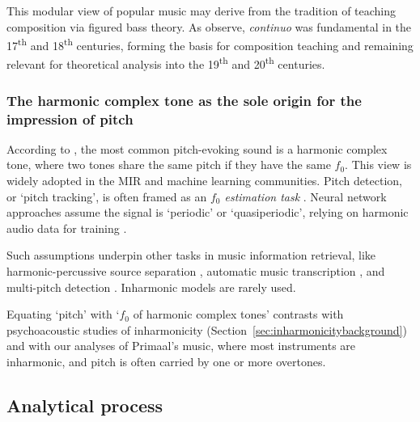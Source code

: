 \documentclass{article}
\begin{document}
This modular view of popular music may derive from the tradition of teaching composition via figured bass theory. As \citet{williams2001continuo} observe, \emph{continuo} was fundamental in the 17\textsuperscript{th} and 18\textsuperscript{th} centuries, forming the basis for composition teaching and remaining relevant for theoretical analysis into the 19\textsuperscript{th} and 20\textsuperscript{th} centuries.



\subsubsection{The harmonic complex tone as the sole origin for the impression of pitch}\label{ref:soleorigin}

According to \citet{oxenham2012pitch}, the most common pitch-evoking sound is a harmonic complex tone, where two tones share the same pitch if they have the same $f_0$. This view is widely adopted in the MIR and machine learning communities. Pitch detection, or `pitch tracking', is often framed as an \emph{$f_0$ estimation task} \citep{drugman2018traditional,kim2018crepe}. Neural network approaches assume the signal is `periodic' or `quasiperiodic', relying on harmonic audio data for training \citep{riou2023pesto}.


Such assumptions underpin other tasks in music information retrieval, like harmonic-percussive source separation \citep{ono2008real}, automatic music transcription \citep{ewert2014score}, and multi-pitch detection \citep{christensen2008multi}. Inharmonic models \citep{vincent2008harmonic} are rarely used. 

Equating `pitch' with `$f_0$ of harmonic complex tones' contrasts with psychoacoustic studies of inharmonicity (Section~\ref{sec:inharmonicitybackground}) and with our analyses of Primaal's music, where most instruments are inharmonic, and pitch is often carried by one or more overtones.



\subsection{Analytical process}\label{sec:analyticalprocess}
\end{document}
